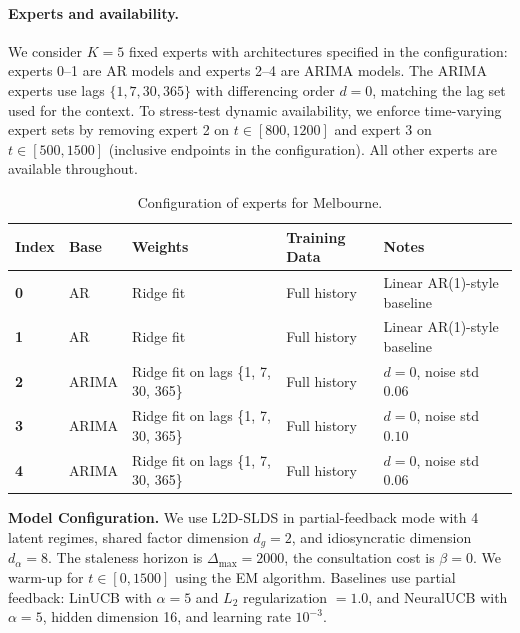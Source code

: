 \paragraph{Experts and availability.}
We consider \(K=5\) fixed experts with architectures specified in the configuration:
experts 0--1 are AR models and experts 2--4 are ARIMA models.
The ARIMA experts use lags \(\{1, 7, 30, 365\}\) with differencing order \(d=0\), matching the lag set used for the
context. To stress-test dynamic availability, we enforce time-varying expert sets by removing expert 2 on
\(t\in[800,1200]\) and expert 3 on \(t\in[500,1500]\) (inclusive endpoints in the configuration). All other experts are
available throughout.

\begin{table}[H]
\centering
\small
\setlength{\tabcolsep}{4pt}
\caption{Configuration of experts for Melbourne.}
\label{tab:experts_melbourne_appendix}
\begin{tabular}{@{}lllll@{}}
\toprule
Index & Base & Weights & Training Data & Notes \\
\midrule
\textbf{0} & AR & Ridge fit  & Full history & Linear AR(1)-style baseline \\
\textbf{1} & AR & Ridge fit  & Full history & Linear AR(1)-style baseline \\
\textbf{2} & ARIMA & Ridge fit on lags \{1, 7, 30, 365\} & Full history & $d=0$, noise std $0.06$ \\
\textbf{3} & ARIMA & Ridge fit on lags \{1, 7, 30, 365\} & Full history & $d=0$, noise std $0.10$ \\
\textbf{4} & ARIMA & Ridge fit on lags \{1, 7, 30, 365\} & Full history & $d=0$, noise std $0.06$ \\
\bottomrule
\end{tabular}
\end{table}

\textbf{Model Configuration.}
We use L2D-SLDS in partial-feedback mode with 4 latent regimes, shared factor dimension
\(d_g=2\), and idiosyncratic dimension \(d_\alpha=8\). The staleness horizon is \(\Delta_{\max}=2000\), the consultation
cost is \(\beta=0\). We warm-up for $t \in [0,1500]$ using the EM algorithm. Baselines use partial feedback: LinUCB with \(\alpha=5\) and \(L_2\) regularization \(=1.0\), and NeuralUCB with
\(\alpha=5\), hidden dimension 16, and learning rate \(10^{-3}\).


